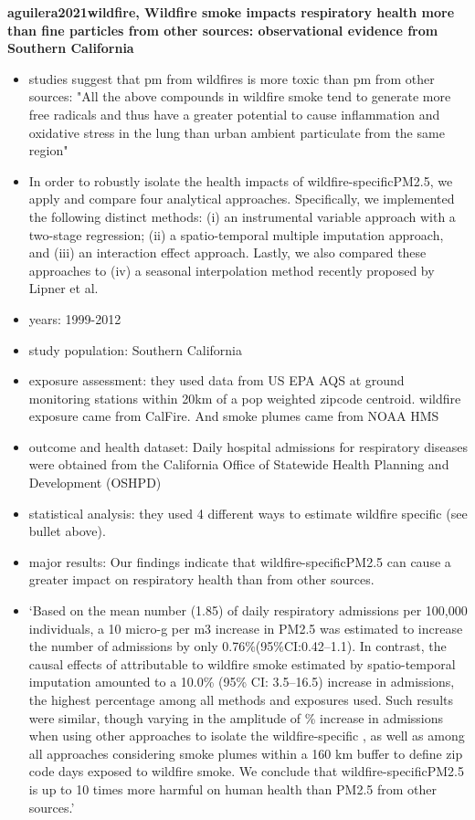 \textbf{aguilera2021wildfire, Wildfire smoke impacts respiratory health more than fine particles from other sources: observational evidence from Southern California}
\begin{itemize}
    \item studies suggest that pm from wildfires is more toxic than pm from other sources: "All the above compounds in wildfire smoke tend to generate more free radicals and thus have a greater potential to cause inflammation and oxidative stress in the lung than urban ambient particulate from the same region"
    \item In order to robustly isolate the health impacts of wildfire-specificPM2.5, we apply and compare four analytical approaches. Specifically, we implemented the following distinct methods: (i) an instrumental variable approach with a two-stage regression; (ii) a spatio-temporal multiple imputation approach, and (iii) an interaction effect approach. Lastly, we also compared these approaches to (iv) a seasonal interpolation method recently proposed by Lipner et al.
    \item years: 1999-2012
    \item study population: Southern California
    \item exposure assessment: they used \PM data from US EPA AQS at ground monitoring stations within 20km of a pop weighted zipcode centroid. wildfire exposure came from CalFire. And smoke plumes came from NOAA HMS
    \item outcome and health dataset: Daily hospital admissions for respiratory diseases were obtained from the California Office of Statewide Health Planning and Development (OSHPD)
    \item statistical analysis: they used 4 different ways to estimate wildfire specific \PM (see bullet above). 
    \item major results: Our findings indicate that wildfire-specificPM2.5 can cause a greater impact on respiratory health than \PM from other sources.
    \item `Based on the mean number (1.85) of daily respiratory admissions per 100,000 individuals, a 10 micro-g per m3 increase in PM2.5 was estimated to increase the number of admissions by only 0.76\%(95\%CI:0.42–1.1). In contrast, the causal effects of \PM attributable to wildfire smoke estimated by spatio-temporal imputation amounted to a 10.0\% (95\% CI: 3.5–16.5) increase in admissions, the highest percentage among all methods and exposures used. Such results were similar, though varying in the amplitude of \% increase in admissions when using other approaches to isolate the wildfire-specific \PM, as well as among all approaches considering smoke plumes within a 160 km buffer to define zip code days exposed to wildfire smoke. We conclude that wildfire-specificPM2.5 is up to 10 times more harmful on human health than PM2.5 from other sources.'
\end{itemize}

